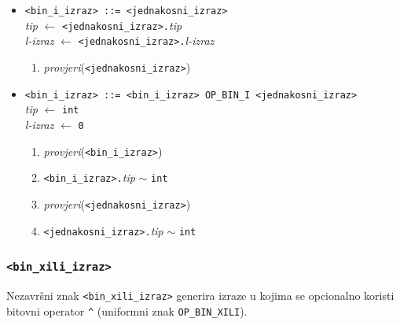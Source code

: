 \documentclass[times, 12pt, utf8]{book}
\begin{document}
\begin{itemize}

\item
\verb|<bin_i_izraz> ::= <jednakosni_izraz>|\\
\emph{tip} \(\leftarrow\) \verb|<jednakosni_izraz>.|\emph{tip}\\
\emph{l-izraz} \(\leftarrow\) \verb|<jednakosni_izraz>.|\emph{l-izraz}
\begin{enumerate}
\item
\emph{provjeri}(\verb|<jednakosni_izraz>|)
\end{enumerate}

\item
\verb#<bin_i_izraz> ::= <bin_i_izraz> OP_BIN_I <jednakosni_izraz>#\\
\emph{tip} \(\leftarrow\) \verb|int|\\
\emph{l-izraz} \(\leftarrow\) \verb|0|
\begin{enumerate}
\item
\emph{provjeri}(\verb|<bin_i_izraz>|)
\item
\verb|<bin_i_izraz>.|\emph{tip} \(\sim\) \verb|int|
\item
\emph{provjeri}(\verb|<jednakosni_izraz>|)
\item
\verb|<jednakosni_izraz>.|\emph{tip} \(\sim\) \verb|int|
\end{enumerate}

\end{itemize}

\subsubsection{\texttt{<bin\_xili\_izraz>}}

Nezavršni znak \verb|<bin_xili_izraz>| generira izraze u kojima se opcionalno koristi bitovni operator \verb|^| (uniformni znak \verb|OP_BIN_XILI|).
\end{document}
